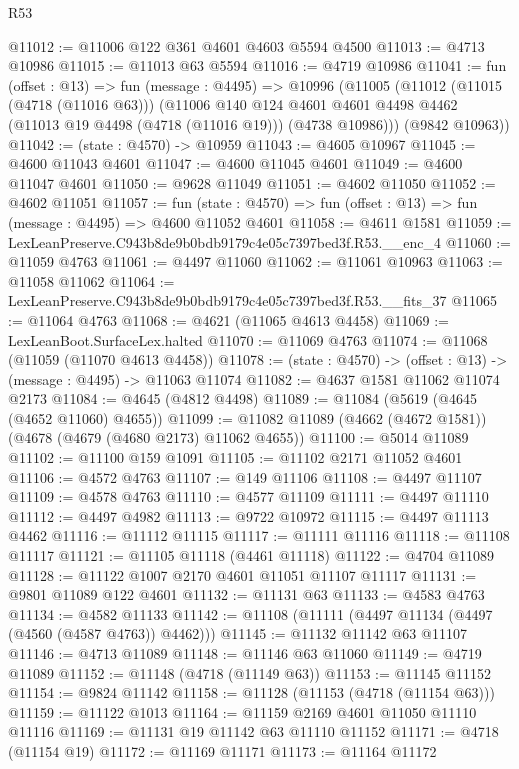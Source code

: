 \begin{lexlean}{R53}
\begin{coremodule}
@11012 := @11006 @122 @361 @4601 @4603 @5594 @4500
@11013 := @4713 @10986
@11015 := @11013 @63 @5594
@11016 := @4719 @10986
@11041 := fun (offset : @13) =>
  fun (message : @4495) =>
  @10996
    (@11005
      (@11012
        (@11015 (@4718 (@11016 @63)))
        (@11006
          @140
          @124
          @4601
          @4601
          @4498
          @4462
          (@11013 @19 @4498 (@4718 (@11016 @19)))
          (@4738 @10986)))
      (@9842 @10963))
@11042 := (state : @4570) -> @10959
@11043 := @4605 @10967
@11045 := @4600 @11043 @4601
@11047 := @4600 @11045 @4601
@11049 := @4600 @11047 @4601
@11050 := @9628 @11049
@11051 := @4602 @11050
@11052 := @4602 @11051
@11057 := fun (state : @4570) => fun (offset : @13) => fun (message : @4495) => @4600 @11052 @4601
@11058 := @4611 @1581
@11059 := LexLeanPreserve.C943b8de9b0bdb9179c4e05c7397bed3f.R53.__enc_4
@11060 := @11059 @4763
@11061 := @4497 @11060
@11062 := @11061 @10963
@11063 := @11058 @11062
@11064 := LexLeanPreserve.C943b8de9b0bdb9179c4e05c7397bed3f.R53.__fits_37
@11065 := @11064 @4763
@11068 := @4621 (@11065 @4613 @4458)
@11069 := LexLeanBoot.SurfaceLex.halted
@11070 := @11069 @4763
@11074 := @11068 (@11059 (@11070 @4613 @4458))
@11078 := (state : @4570) -> (offset : @13) -> (message : @4495) -> @11063 @11074
@11082 := @4637 @1581 @11062 @11074 @2173
@11084 := @4645 (@4812 @4498)
@11089 := @11084 (@5619 (@4645 (@4652 @11060) @4655))
@11099 := @11082 @11089 (@4662 (@4672 @1581)) (@4678 (@4679 (@4680 @2173) @11062 @4655))
@11100 := @5014 @11089
@11102 := @11100 @159 @1091
@11105 := @11102 @2171 @11052 @4601
@11106 := @4572 @4763
@11107 := @149 @11106
@11108 := @4497 @11107
@11109 := @4578 @4763
@11110 := @4577 @11109
@11111 := @4497 @11110
@11112 := @4497 @4982
@11113 := @9722 @10972
@11115 := @4497 @11113 @4462
@11116 := @11112 @11115
@11117 := @11111 @11116
@11118 := @11108 @11117
@11121 := @11105 @11118 (@4461 @11118)
@11122 := @4704 @11089
@11128 := @11122 @1007 @2170 @4601 @11051 @11107 @11117
@11131 := @9801 @11089 @122 @4601
@11132 := @11131 @63
@11133 := @4583 @4763
@11134 := @4582 @11133
@11142 := @11108 (@11111 (@4497 @11134 (@4497 (@4560 (@4587 @4763)) @4462)))
@11145 := @11132 @11142 @63 @11107
@11146 := @4713 @11089
@11148 := @11146 @63 @11060
@11149 := @4719 @11089
@11152 := @11148 (@4718 (@11149 @63))
@11153 := @11145 @11152
@11154 := @9824 @11142
@11158 := @11128 (@11153 (@4718 (@11154 @63)))
@11159 := @11122 @1013
@11164 := @11159 @2169 @4601 @11050 @11110 @11116
@11169 := @11131 @19 @11142 @63 @11110 @11152
@11171 := @4718 (@11154 @19)
@11172 := @11169 @11171
@11173 := @11164 @11172

\end{coremodule}
\end{lexlean}
